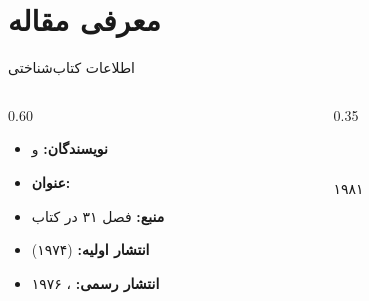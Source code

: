 \documentclass[aspectratio=169,11pt]{beamer}
\newcommand{\keyword}[1]{\textcolor{MainBlue}{\textbf{#1}}}
\begin{document}
\section{معرفی مقاله}

\begin{frame}{اطلاعات کتاب‌شناختی}
  \begin{LTR}
  \begin{columns}[T]
    \begin{column}{0.60\textwidth}
      \begin{RTL}
      \begin{itemize}
        \item \keyword{نویسندگان:}  و 
        \item \keyword{عنوان:} 
        \item \keyword{منبع:} فصل ۳۱ در کتاب
        \item \keyword{انتشار اولیه:}  (۱۹۷۴)
        \item \keyword{انتشار رسمی:} ، ۱۹۷۶
      \end{itemize}
      \end{RTL}
    \end{column}
    \hfill
    \begin{column}{0.35\textwidth}
      \begin{RTL}
      \begin{block}{}
        \centering
        {\color{MainBlue}\Huge\faBookOpen}\\[0.4cm]
        {\footnotesize{}}\\[0.2cm]
        {\small ۱۹۸۱}
      \end{block}
      \end{RTL}
    \end{column}
  \end{columns}
  \end{LTR}
\end{frame}
\end{document}
